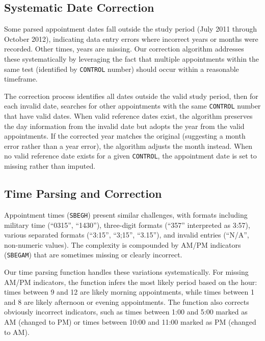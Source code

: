 \documentclass{article}
\begin{document}
\subsection{Systematic Date Correction}

Some parsed appointment dates fall outside the study period (July 2011 through October 2012), indicating data entry errors where incorrect years or months were recorded. Other times, years are missing. Our correction algorithm addresses these systematically by leveraging the fact that multiple appointments within the same test (identified by \texttt{CONTROL} number) should occur within a reasonable timeframe.

The correction process identifies all dates outside the valid study period, then for each invalid date, searches for other appointments with the same \texttt{CONTROL} number that have valid dates. When valid reference dates exist, the algorithm preserves the day information from the invalid date but adopts the year from the valid appointments. If the corrected year matches the original (suggesting a month error rather than a year error), the algorithm adjusts the month instead. When no valid reference date exists for a given \texttt{CONTROL}, the appointment date is set to missing rather than imputed.

\subsection{Time Parsing and Correction}

Appointment times (\texttt{SBEGH}) present similar challenges, with formats including military time (``0315'', ``1430''), three-digit formats (``357'' interpreted as 3:57), various separated formats (``3:15'', ``3;15'', ``3.15''), and invalid entries (``N/A'', non-numeric values). The complexity is compounded by AM/PM indicators (\texttt{SBEGAM}) that are sometimes missing or clearly incorrect.

Our time parsing function handles these variations systematically. For missing AM/PM indicators, the function infers the most likely period based on the hour: times between 9 and 12 are likely morning appointments, while times between 1 and 8 are likely afternoon or evening appointments. The function also corrects obviously incorrect indicators, such as times between 1:00 and 5:00 marked as AM (changed to PM) or times between 10:00 and 11:00 marked as PM (changed to AM).
\end{document}
